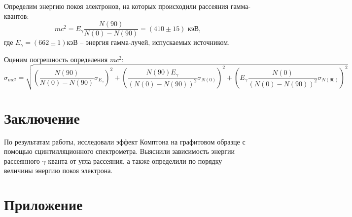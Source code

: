 \documentclass[a4paper, 12pt]{article}
\begin{document}
	Определим энергию покоя электронов, на которых происходили рассеяния гамма-квантов:
	$$
	mc^2 = E_\gamma \frac{N(90)}{N(0) - N(90)} = \left( 410 \pm 15 \right) \text{ кэВ},
	$$
	где $E_\gamma = (662 \pm 1) кэВ$ -- энергия гамма-лучей, испускаемых источником. 
 
    Оценим погрешность определения $mc^2$:\\
	$$\sigma_{mc^2} = \sqrt{\left(\frac{N(90)}{N(0) - N(90)} \sigma_{E_\gamma} \right)^2 + \left(\frac{N(90) E_\gamma}{(N(0) - N(90))^2} \sigma_{N(0)}\right)^2 + \left(E_\gamma \frac{N(0)}{(N(0) - N(90))^2}\sigma_{N(90)}\right)^2}$$

    \section{Заключение}

    По результатам работы, исследовали эффект Комптона на графитовом образце с помощью сцинтилляционного спектрометра. Выяснили зависимость  энергии рассеянного $\gamma$-кванта от угла рассеяния, а также определили по порядку величины энергию покоя электрона.

    \newpage

    \section*{Приложение}
\end{document}
